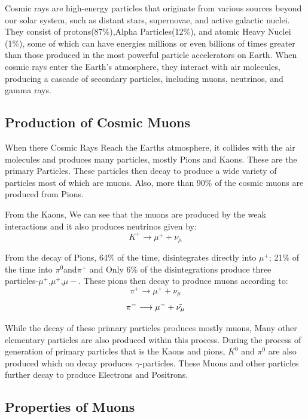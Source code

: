 \documentclass{article}
\begin{document}
\begin{multicols}{2}
Cosmic rays are high-energy particles that originate from various sources beyond our 
solar system, such as distant stars, supernovae, and active galactic nuclei. They consist of 
protons(87\%),Alpha Particles(12\%), and atomic Heavy Nuclei (1\%), some of which can have energies millions or even billions 
of times greater than those produced in the most powerful particle accelerators on Earth. When 
cosmic rays enter the Earth's atmosphere, they interact with air molecules, producing a cascade 
of secondary particles, including muons, neutrinos, and gamma rays.

\subsection{Production of Cosmic Muons}
When there Cosmic Rays Reach the Earths atmosphere, it collides with the air molecules and produces 
many particles, mostly Pions and Kaons. These are the primary Particles. These particles then decay to produce a wide variety
of particles most of which are muons. Also, more than 90\% of the cosmic muons are produced from Pions.

From the Kaons, We can see that the muons are produced by the weak interactions and it also produces neutrinos given by:
\begin{equation}
    K^{+} \longrightarrow \mu^{+} + \nu_{\mu}
\end{equation}

From the decay of Pions, 64\% of the time, disintegrates directly into $\mu^+$; 21\% of the time into $\pi^0$and$\pi^+$ and Only 6\% of the disintegrations produce three particles-$\mu^+$,$\mu^+$,$\mu-$. These pions then decay to produce muons according to:
\begin{equation}
    \pi^{+} \longrightarrow \mu^{+} + \nu_{\mu}
\end{equation}
\begin{equation}
    \pi^{-} \longrightarrow \mu^{-} + \Bar{\nu_{\mu}}
\end{equation}



While the decay of these primary particles produces mostly muons, Many other elementary particles are also produced
within this process. During the process of generation of primary particles that is the Kaons and pions, $K^0$ and $\pi^0$ are also produced
which on decay produces $\gamma$-particles. These Muons and other particles further decay to produce Electrons and Positrons.


\subsection{Properties of Muons}


\end{multicols}
\end{document}
